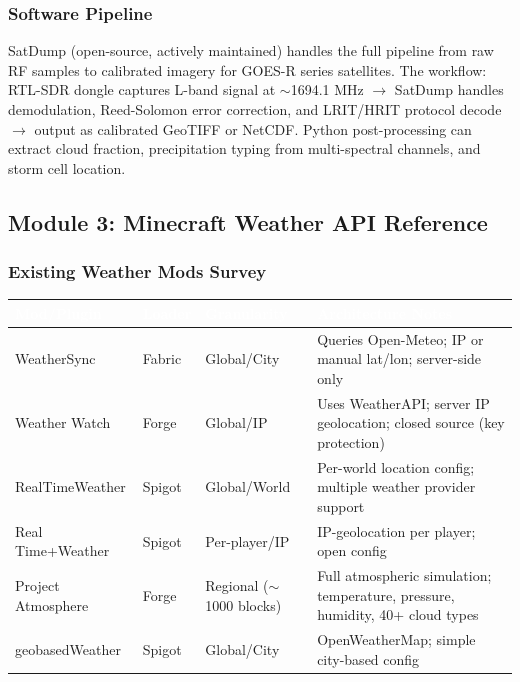 \documentclass[11pt,letterpaper]{article}
\newcommand{\tableheader}[1]{\textbf{\sffamily\textcolor{white}{#1}}}
\begin{document}
\subsubsection{Software Pipeline}

SatDump (open-source, actively maintained) handles the full pipeline from raw RF samples to calibrated imagery for GOES-R series satellites. The workflow: RTL-SDR dongle captures L-band signal at $\sim$1694.1 MHz $\rightarrow$ SatDump handles demodulation, Reed-Solomon error correction, and LRIT/HRIT protocol decode $\rightarrow$ output as calibrated GeoTIFF or NetCDF. Python post-processing can extract cloud fraction, precipitation typing from multi-spectral channels, and storm cell location.

\subsection{Module 3: Minecraft Weather API Reference}

\subsubsection{Existing Weather Mods Survey}

\begin{center}
\begin{tabularx}{\textwidth}{L{3cm}L{2cm}L{2cm}X}
\toprule
{}
\tableheader{Mod/Plugin} & \tableheader{Loader} & \tableheader{Granularity} & \tableheader{Architecture Notes} \\
\midrule
WeatherSync & Fabric & Global/City & Queries Open-Meteo; IP or manual lat/lon; server-side only \\
Weather Watch & Forge & Global/IP & Uses WeatherAPI; server IP geolocation; closed source (key protection) \\
RealTimeWeather & Spigot & Global/World & Per-world location config; multiple weather provider support \\
Real Time+Weather & Spigot & Per-player/IP & IP-geolocation per player; open config \\
Project Atmosphere & Forge & Regional ($\sim$1000 blocks) & Full atmospheric simulation; temperature, pressure, humidity, 40+ cloud types \\
geobasedWeather & Spigot & Global/City & OpenWeatherMap; simple city-based config \\
\bottomrule
\end{tabularx}
\end{center}
\end{document}
